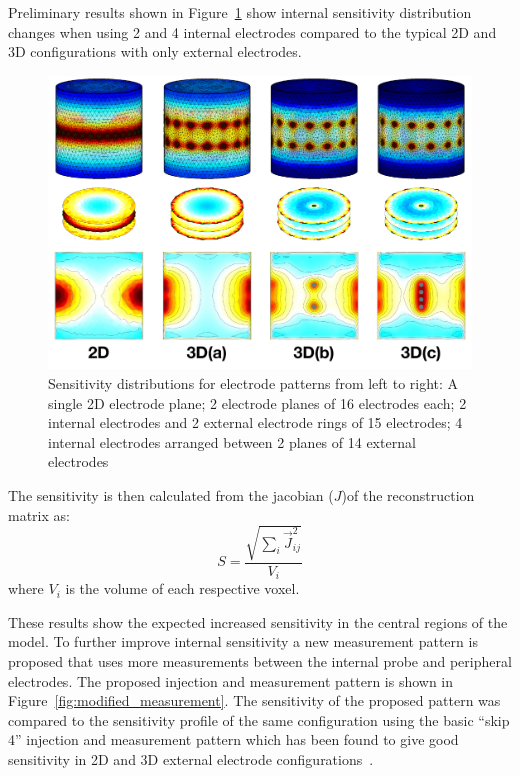 Preliminary results shown in Figure~\ref{fig:internal_sensitivity} show internal sensitivity distribution changes when using 2 and 4 internal electrodes compared to the
typical 2D and 3D configurations with only external electrodes. 


\begin{figure}
\centering
\includegraphics[width=\textwidth]{chapter6-internal_electrodes/imgs/Sensitivity_Comparison_new.pdf}
\caption[Sensitivity with different internal electrode configurations]{Sensitivity distributions for electrode patterns from left to right: A single 2D electrode plane; 2 electrode planes of 16 electrodes 
each; 2 internal electrodes and 2 external electrode rings of 15 electrodes; 4 internal electrodes arranged between 2 planes of 14 external
electrodes}
\label{fig:internal_sensitivity}
\end{figure}

The sensitivity is then calculated from the jacobian ($J$)of  the reconstruction matrix as:
$$ S = \frac{\sqrt{\sum_{i}\vec{J}_{ij}^2}}{V_i}  $$
where $V_i$ is the volume of each respective voxel. 

These results show the expected increased sensitivity in the central regions of the model. To further improve internal sensitivity a new
measurement pattern is proposed that uses more measurements between the internal probe and peripheral electrodes. The proposed injection and measurement
pattern is shown in Figure~\ref{fig:modified_measurement}.
The sensitivity of the proposed pattern was compared to the sensitivity profile of the same configuration using 
the basic ``skip 4'' injection and measurement pattern which has been found to 
give good sensitivity in 2D and 3D external electrode configurations~\cite{Grychtol2016}.


